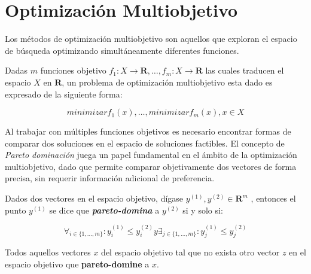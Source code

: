 \section{Optimización Multiobjetivo}\label{section:multiobjective}

Los métodos de optimización multiobjetivo son aquellos que exploran el espacio de búsqueda optimizando simultáneamente diferentes funciones.

\begin{definition}
\label{definition:multiobjective}

    Dadas $m$ funciones objetivo $f_1: X \rightarrow \mathbf{R}, \dots, f_m: X \rightarrow \mathbf{R}$ las cuales traducen el espacio $X$ en $\mathbf{R}$, un problema de optimización multiobjetivo esta dado es expresado de la siguiente forma:

    \begin{equation}
        minimizar f_1(x), \dots, minimizar f_m(x), x \in X
    \end{equation}
\end{definition}

Al trabajar con múltiples funciones objetivos es necesario encontrar formas de comparar dos soluciones en el espacio de soluciones factibles.
El concepto de \textit{Pareto dominación} juega un papel fundamental en el ámbito de la optimización multiobjetivo, dado que permite comparar objetivamente dos vectores de forma precisa, sin requerir información adicional de preferencia.

\begin{definition}
\label{definition:pareto-dominance}

    Dados dos vectores en el espacio objetivo, dígase $y^{(1)}, y^{(2)} \in \mathbf{R}^m$ , entonces el punto $y^{(1)}$ se dice que \textbf{\textit{pareto-domina}} a $y^{(2)}$ si y solo si:

    \begin{equation}
        \forall_{i\in\{1,\dots,m\}}: y_i^{(1)} \leq y_i^{(2)} y \exists_{j\in\{1,\dots,m\}}: y_j^{(1)} \le y_j^{(2)}
    \end{equation}
\end{definition}

\begin{definition}
\label{definition:pareto-front}
    Todos aquellos vectores $x$ del espacio objetivo tal que no exista otro vector $z$ en el espacio objetivo que \textbf{pareto-domine} a $x$.
\end{definition}

